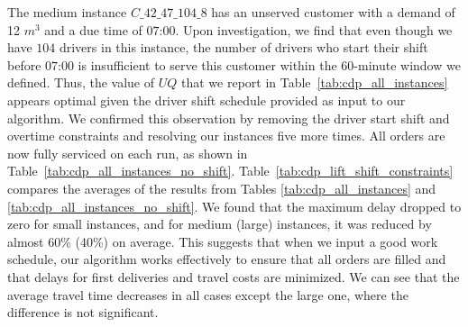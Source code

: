 \documentclass[authoryear,preprint,review,11pt]{elsarticle}
\begin{document}
The medium instance $C\_42\_47\_104\_8$ has an unserved customer with a demand of 12 $m^3$ and a due time of $07\text{:}00$. Upon investigation, we find that even though we have $104$ drivers in this instance, the number of drivers who start their shift before $07\text{:}00$ is insufficient to serve this customer within the 60-minute window we defined. Thus, the value of $UQ$ that we report in Table~\ref{tab:cdp_all_instances} appears optimal given the driver shift schedule provided as input to our algorithm. We confirmed this observation by removing the driver start shift and overtime constraints and resolving our instances five more times. All orders are now fully serviced on each run, as shown in Table~\ref{tab:cdp_all_instances_no_shift}. Table~\ref{tab:cdp_lift_shift_constraints} compares the averages of the results from Tables \ref{tab:cdp_all_instances} and \ref{tab:cdp_all_instances_no_shift}. We found that the maximum delay dropped to zero for small instances, and for medium (large) instances, it was reduced by almost 60\% (40\%) on average. This suggests that when we input a good work schedule, our algorithm works effectively to ensure that all orders are filled and that delays for first deliveries and travel costs are minimized. We can see that the average travel time decreases in all cases except the large one, where the difference is not significant.
\end{document}
